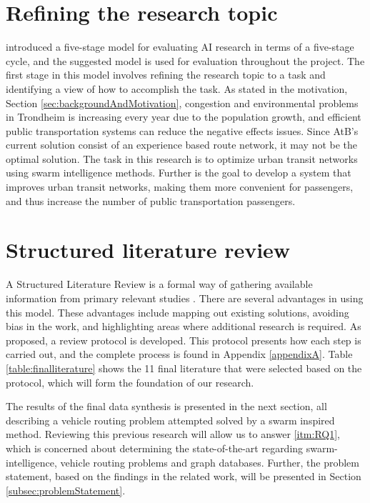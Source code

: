 \section{Refining the research topic}
\label{sec:definingResearchTopic}

\citet{cohen88} introduced a five-stage model for evaluating AI research in terms of a five-stage cycle, and the suggested model is used for evaluation throughout the project. The first stage in this model involves refining the research topic to a task and identifying a view of how to accomplish the task. As stated in the motivation, Section \vref{sec:backgroundAndMotivation}, congestion and environmental problems in Trondheim is increasing every year due to the population growth, and efficient public transportation systems can reduce the negative effects issues. Since AtB's current solution consist of an experience based route network, it may not be the optimal solution. The task in this research is to optimize urban transit networks using swarm intelligence methods. Further is the goal to develop a system that improves urban transit networks, making them more convenient for passengers, and thus increase the number of public transportation passengers.

\section{Structured literature review}
\label{sec:structuredLiteratureReview}

A Structured Literature Review is a formal way of gathering available information from primary relevant studies \citep{kofod2014}. There are several advantages in using this model. These advantages include mapping out existing solutions, avoiding bias in the work, and highlighting areas where additional research is required. As proposed, a review protocol is developed. This protocol presents how each step is carried out, and the complete process is found in Appendix \vref{appendixA}. Table \vref{table:finalliterature} shows the 11 final literature that were selected based on the protocol, which will form the foundation of our research.

The results of the final data synthesis is presented in the next section, all describing a vehicle routing problem attempted solved by a swarm inspired method. Reviewing this previous research will allow us to answer \ref{itm:RQ1}, which is concerned about determining the state-of-the-art regarding swarm-intelligence, vehicle routing problems and graph databases. Further, the problem statement, based on the findings in the related work, will be presented in Section \vref{subsec:problemStatement}. 

